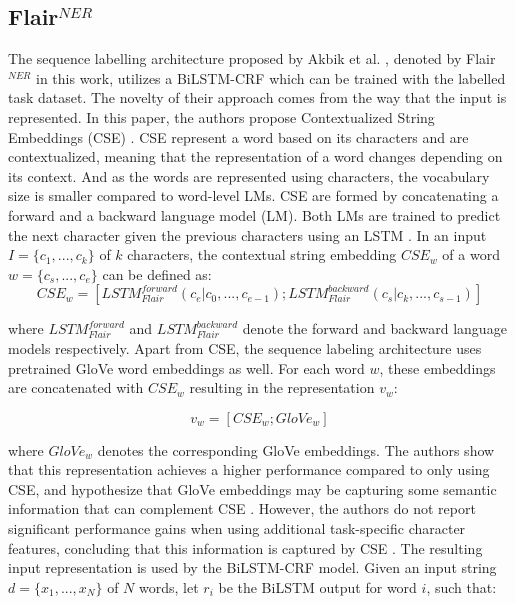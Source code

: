 \documentclass{report}
\theoremstyle{definition}
\theoremstyle{remark}
\begin{document}
\subsection{Flair$^{NER}$}
The sequence labelling architecture proposed by Akbik et al. \cite{flairpaper}, denoted by Flair$^{NER}$ in this work, utilizes a BiLSTM-CRF \cite{BiLSTMCRF} which can be trained with the labelled task dataset. The novelty of their approach comes from the way that the input is represented. In this paper, the authors propose Contextualized String Embeddings (CSE) \cite{flairpaper}. CSE represent a word based on its characters and are contextualized, meaning that the representation of a word changes depending on its context. And as the words are represented using characters, the vocabulary size is smaller compared to word-level LMs. CSE are formed by concatenating a forward and a backward language model (LM). Both LMs are trained to predict the next character given the previous characters using an LSTM \cite{lstm}. In an input $I=\{c_1,...,c_k\}$ of $k$ characters, the contextual string embedding $CSE_w$ of a word $w=\{c_s,...,c_e\}$ can be defined as:
\begin{equation}
    CSE_w = [ LSTM^{forward}_{Flair}(c_e | c_0,...,c_{e-1}); LSTM^{backward}_{Flair}(c_s | c_k,...,c_{s-1}) ]
\end{equation}

\noindent where $LSTM^{forward}_{Flair}$ and $LSTM^{backward}_{Flair}$ denote the forward and backward language models respectively. Apart from CSE, the sequence labeling architecture uses pretrained GloVe \cite{glove} word embeddings as well. For each word $w$, these embeddings are concatenated with $CSE_w$ resulting in the representation $v_w$:

\begin{equation}
    v_w = [CSE_w;GloVe_w]
\end{equation}

\noindent where $GloVe_w$ denotes the corresponding GloVe embeddings. The authors show that this representation achieves a higher performance compared to only using CSE, and hypothesize that GloVe embeddings may be capturing some semantic information that can complement CSE \cite{flairpaper}. However, the authors do not report significant performance gains when using additional task-specific character features, concluding that this information is captured by CSE \cite{flairpaper}. The resulting input representation is used by the BiLSTM-CRF model. Given an input string $d=\{x_1,...,x_N\}$ of $N$ words, let $r_i$ be the BiLSTM output for word $i$, such that:
\end{document}
